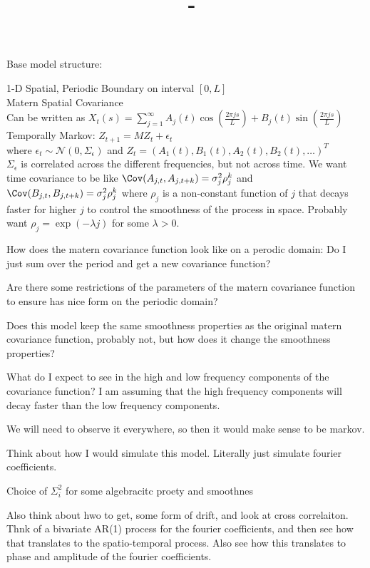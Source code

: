 \documentclass[answers,12pt,addpoints]{exam}
\author{\name}
\title{\course \ - \assignment}
\begin{document}
\maketitle

\newpage

Base model structure:

1-D Spatial, Periodic Boundary on interval $[0,L]$\\
Matern Spatial Covariance\\
Can be written as $X_t(s) = \sum_{j=1}^\infty A_j(t) \cos\left(\frac{2\pi j s}{L}\right) + B_j(t) \sin\left(\frac{2\pi j s}{L}\right)$\\
Temporally Markov: $Z_{t+1} = M Z_t + \epsilon_t$\\
where $\epsilon_t \sim \mathcal{N}(0, \Sigma_\epsilon)$ and $Z_t = (A_1(t), B_1(t), A_2(t), B_2(t), \ldots)^T$\\
$\Sigma_\epsilon$ is correlated across the different frequencies, but not across time.
We want time covariance to be like $\Cov(A_{j,t}, A_{j,t+k}) = \sigma_j^2 \rho_j^k$ and $\Cov(B_{j,t}, B_{j,t+k}) = \sigma_j^2 \rho_j^k$ where $\rho_j$ is a non-constant function of $j$ that decays faster for higher $j$ to control the smoothness of the process in space. Probably want $\rho_j = \exp(-\lambda j)$ for some $\lambda > 0$.


\begin{questions}
\question How does the matern covariance function look like on a perodic domain: Do I just sum over the period and get a new covariance function?

\question Are there some restrictions of the parameters of the matern covariance function to ensure has nice form on the periodic domain?

\question Does this model keep the same smoothness properties as the original matern covariance function, probably not, but how does it change the smoothness properties?

\question What do I expect to see in the high and low frequency components of the covariance function? 
I am assuming that the high frequency components will decay faster than the low frequency components. 
\end{questions}


We will need to observe it everywhere, so then it would make sense to be markov. 

Think about how I would simulate this model. Literally just simulate fourier coefficients. 

Choice of $\Sigma_i^2$ for some algebracitc proety and smoothnes

Also think about hwo to get, some form of drift, and look at cross correlaiton. Thnk of a bivariate AR(1) process for the fourier coefficients, and then see how that translates to the spatio-temporal process. Also see how this translates to phase and amplitude of the fourier coefficients.
\end{document}
